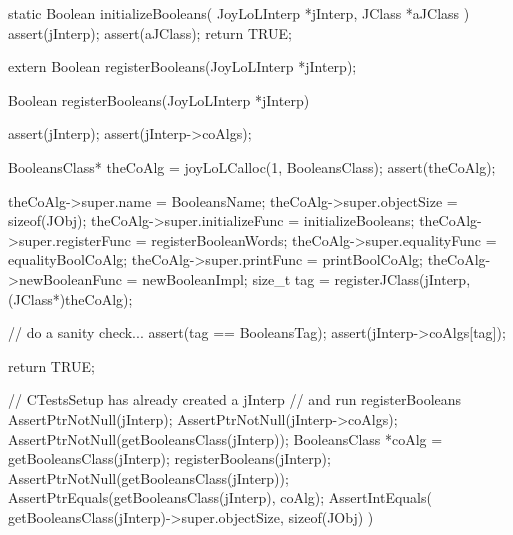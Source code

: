 \stopCHeader

\startCCode
static Boolean initializeBooleans(
  JoyLoLInterp *jInterp,
  JClass   *aJClass
) {
  assert(jInterp);
  assert(aJClass);
  return TRUE;
}
\stopCCode

\startCHeader
extern Boolean registerBooleans(JoyLoLInterp *jInterp);
\stopCHeader
{}

\startCCode
Boolean registerBooleans(JoyLoLInterp *jInterp) {
  assert(jInterp);
  assert(jInterp->coAlgs);
  
  BooleansClass* theCoAlg
    = joyLoLCalloc(1, BooleansClass);
  assert(theCoAlg);
  
  theCoAlg->super.name           = BooleansName;
  theCoAlg->super.objectSize     = sizeof(JObj);
  theCoAlg->super.initializeFunc = initializeBooleans;
  theCoAlg->super.registerFunc   = registerBooleanWords;
  theCoAlg->super.equalityFunc   = equalityBoolCoAlg;
  theCoAlg->super.printFunc      = printBoolCoAlg;
  theCoAlg->newBooleanFunc       = newBooleanImpl;
  size_t tag =
    registerJClass(jInterp, (JClass*)theCoAlg);
  
  // do a sanity check...
  assert(tag == BooleansTag);
  assert(jInterp->coAlgs[tag]);
   
  return TRUE;
}
\stopCCode


\startCTest
  // CTestsSetup has already created a jInterp
  // and run registerBooleans
  AssertPtrNotNull(jInterp);
  AssertPtrNotNull(jInterp->coAlgs);
  AssertPtrNotNull(getBooleansClass(jInterp));
  BooleansClass *coAlg = getBooleansClass(jInterp);
  registerBooleans(jInterp);
  AssertPtrNotNull(getBooleansClass(jInterp));
  AssertPtrEquals(getBooleansClass(jInterp), coAlg);
  AssertIntEquals(
    getBooleansClass(jInterp)->super.objectSize,
    sizeof(JObj)
  )
\stopCTest
\stopTestCase
\stopTestSuite
